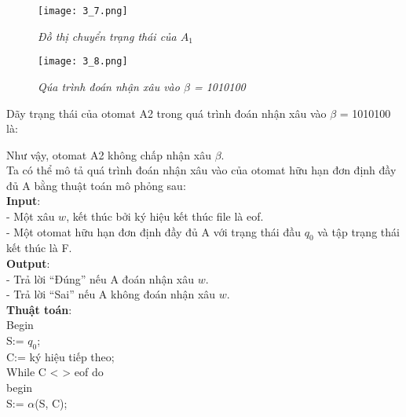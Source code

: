 \begin{flushleft}
\begin{figure}[ht]
\texttt{[image: 3\_7.png]}
\caption{ \textit{Đồ thị chuyển trạng thái của $A_1$} }
\end{figure}
\end{flushleft}

\begin{figure}[ht]
\texttt{[image: 3\_8.png]}
\caption{ \textit{Qúa trình đoán nhận xâu vào $\beta$ = 1010100} }
\end{figure}

\begin{flushleft}
Dãy trạng thái của otomat A2 trong quá trình đoán nhận xâu vào $\beta$ = 1010100 là:
\end{flushleft}

\begin{flushleft}
Như vậy, otomat A2 không chấp nhận xâu $\beta$.\\
Ta có thể mô tả quá trình đoán nhận xâu vào của otomat hữu hạn đơn định đầy đủ A bằng thuật toán mô phỏng sau:\\
\hspace{10mm} \textbf{Input}:\\
\hspace{10mm} - Một xâu $w$, kết thúc bởi ký hiệu kết thúc file là eof.\\
\hspace{10mm} - Một otomat hữu hạn đơn định đầy đủ A với trạng thái đầu $q_0$ và tập trạng thái kết thúc là F.\\
\hspace{10mm} \textbf{Output}:\\
\hspace{10mm} - Trả lời “Đúng” nếu A đoán nhận xâu $w$.\\
\hspace{10mm} - Trả lời “Sai” nếu A không đoán nhận xâu $w$.\\
\hspace{10mm} \textbf{Thuật toán}:\\
Begin\\
\hspace{10mm} S:= $q_0$;\\
\hspace{10mm} C:= ký hiệu tiếp theo;\\
\hspace{10mm} While C < > eof do\\
\hspace{20mm} begin\\
\hspace{30mm} S:= $\alpha$(S, C);\\

\end{flushleft}

